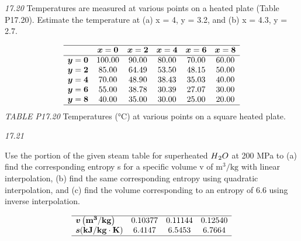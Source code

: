 \documentclass[../main.tex]{subfiles}
\begin{document}
\begin{multicols}{2}
\noindent\textit{17.20} Temperatures are measured at various points on a
heated plate (Table P17.20). Estimate the temperature at
(a) x = 4, y = 3.2, and (b) x = 4.3, y = 2.7.

$$
\begin{array}{lccccc}
\hline & \boldsymbol{x}=\mathbf{0} & \boldsymbol{x}=\mathbf{2} & \boldsymbol{x}=\mathbf{4} & \boldsymbol{x}=\mathbf{6} & \boldsymbol{x}=\mathbf{8} \\
\hline \boldsymbol{y} = \mathbf { 0 } & 100.00 & 90.00 & 80.00 & 70.00 & 60.00 \\
\boldsymbol{y}=\mathbf{2} & 85.00 & 64.49 & 53.50 & 48.15 & 50.00 \\
\boldsymbol{y}=\mathbf{4} & 70.00 & 48.90 & 38.43 & 35.03 & 40.00 \\
\boldsymbol{y}=\mathbf{6} & 55.00 & 38.78 & 30.39 & 27.07 & 30.00 \\
\boldsymbol{y}=\mathbf{8} & 40.00 & 35.00 & 30.00 & 25.00 & 20.00 \\
\hline
\end{array}
$$
\noindent\textit{TABLE P17.20} Temperatures (°C) at various points
on a square heated plate.

\noindent\textit{17.21}

Use the portion of the given steam table for superheated $H\textsubscript{2}O$ at 200 MPa to (a) find the corresponding
entropy s for a specific volume v of $\mathrm{m}^{3} / \mathrm{kg}$ with linear
interpolation, (b) find the same corresponding entropy using
quadratic interpolation, and (c) find the volume corresponding to an entropy of 6.6 using inverse interpolation.

$$
\begin{array}{lccc}
\hline \boldsymbol{v}\left(\mathbf{m}^{\mathbf{3}} / \mathbf{k g}\right) & 0.10377 & 0.11144 & 0.12540 \\
\boldsymbol{s}(\mathbf{k} \mathbf{J} / \mathbf{k g} \cdot \mathbf{K}) & 6.4147 & 6.5453 & 6.7664 \\
\hline
\end{array}
$$

\end{multicols}
\end{document}
